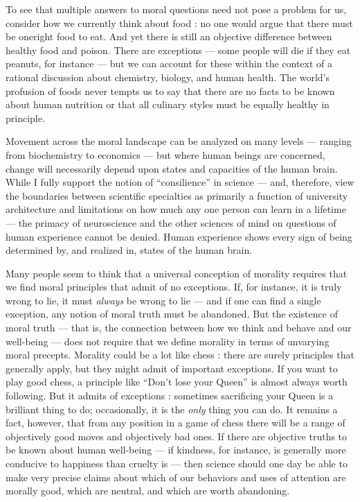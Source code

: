 \documentclass[a4paper,12pt]{extbook}
\begin{document}
To see that multiple answers to moral questions need not pose a problem for us, consider how we currently think about food :
no one would argue that there must be oneright food to eat.
And yet there is still an objective difference between healthy food and poison.
There are exceptions --- some people will die if they eat peanuts, for instance --- but we can account for these within the context of a rational discussion about chemistry, biology, and human health.
The world’s profusion of foods never tempts us to say that there are no facts to be known about human nutrition or that all culinary styles must be equally healthy in principle.

Movement across the moral landscape can be analyzed on many levels --- ranging from biochemistry to economics --- but where human beings are concerned, change will necessarily depend upon states and capacities of the human brain.
While I fully support the notion of ``consilience'' in science --- and, therefore, view the boundaries between scientific specialties as primarily a function of university architecture and limitations on how much any one person can learn in a lifetime --- the primacy of neuroscience and the other sciences of mind on questions of human experience cannot be denied.
Human experience shows every sign of being determined by, and realized in, states of the human brain.

Many people seem to think that a universal conception of morality requires that we find moral principles that admit of no exceptions.
If, for instance, it is truly wrong to lie, it must \textit{always} be wrong to lie --- and if one can find a single exception, any notion of moral truth must be abandoned.
But the existence of moral truth --- that is, the connection between how we think and behave and our well-being --- does not require that we define morality in terms of unvarying moral precepts.
Morality could be a lot like chess :
there are surely principles that generally apply, but they might admit of important exceptions.
If you want to play good chess, a principle like ``Don’t lose your Queen'' is almost always worth following.
But it admits of exceptions :
sometimes sacrificing your Queen is a brilliant thing to do;
occasionally, it is the \textit{only} thing you can do.
It remains a fact, however, that from any position in a game of chess there will be a range of objectively good moves and objectively bad ones.
If there are objective truths to be known about human well-being --- if kindness, for instance, is generally more conducive to happiness than cruelty is --- then science should one day be able to make very precise claims about which of our behaviors and uses of attention are morally good, which are neutral, and which are worth abandoning.
\end{document}
